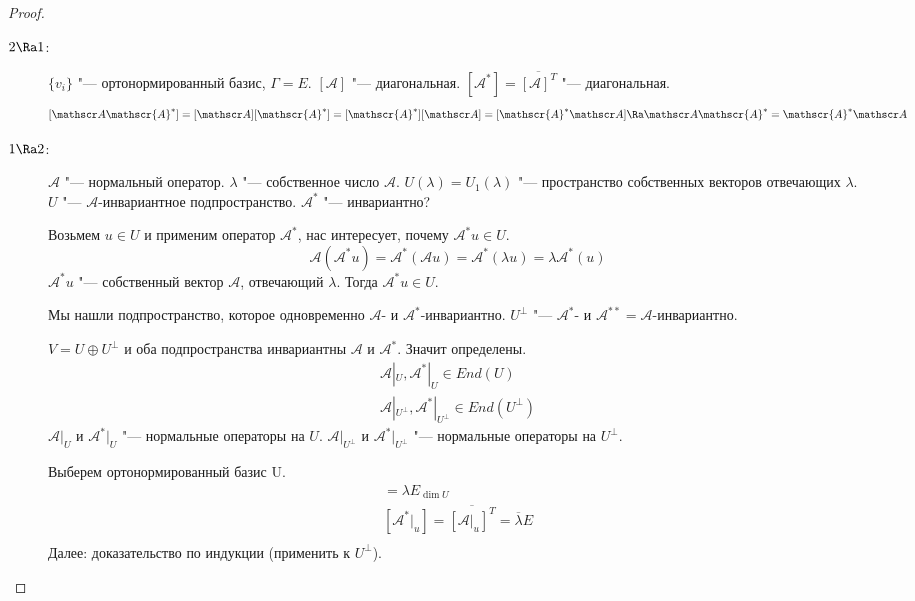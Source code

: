 \begin{proof}
	\begin{description}
	\item[$2 \Ra 1$:]
		$\{v_i\}$ "--- ортонормированный базис, $\Gamma = E$.
		$[\mathscr A] $ "--- диагональная.
		$[\mathscr{A}^*] = \overline{[\mathscr A]^T}$ "--- диагональная.
		\[
			[\mathscr A\mathscr{A}^*]
			= [\mathscr A][\mathscr{A}^*]
			= [\mathscr{A}^*][\mathscr A]
			= [\mathscr{A}^*\mathscr A]
			\Ra \mathscr A\mathscr{A}^*
			= \mathscr{A}^*\mathscr A
		\]

	\item[$1 \Ra 2$:]
		$\mathscr A$ "--- нормальный оператор.
		$\lambda$ "--- собственное число $\mathscr A$.
		$U(\lambda) = U_1(\lambda)$ "--- пространство собственных векторов отвечающих $\lambda$.
		$U$ "--- $\mathscr A$-инвариантное подпространство.
		$\mathscr{A}^*$ "--- инвариантно?

		Возьмем $u \in U$ и применим оператор $\mathscr{A}^*$, нас интересует, почему $\mathscr{A}^*u \in U$.
		\[ \mathscr A(\mathscr{A}^*u) = \mathscr{A}^*(\mathscr Au) = \mathscr{A}^*(\lambda u) = \lambda \mathscr{A}^*(u) \]
		$\mathscr{A}^*u$ "--- собственный вектор $\mathscr A$, отвечающий $\lambda$.
		Тогда $\mathscr{A}^*u \in U$.

		Мы нашли подпространство, которое одновременно $\mathscr A$- и $\mathscr{A}^*$-инвариантно.
		$U^{\bot}$ "--- $\mathscr{A}^*$- и $\mathscr{A}^{**} = \mathscr A$-инвариантно.

		$V = U \oplus U^{\bot}$ и оба подпространства инвариантны $\mathscr A$ и $\mathscr{A}^*$.
		Значит определены.
		\begin{gather*}
			\mathscr A|_U, \mathscr{A}^*|_U \in End(U) \\
			\mathscr A|_{U^{\bot}}, \mathscr{A}^*|_{U^{\bot}} \in End(U^{\bot})
		\end{gather*}
		$\mathscr A|_U$ и $\mathscr{A}^*|_U$ "--- нормальные операторы на $U$.
		$\mathscr A|_{U^{\bot}}$ и $\mathscr{A}^*|_{U^{\bot}}$ "--- нормальные операторы на $U^{\bot}$.

		Выберем ортонормированный базис U.
		\begin{gather*}
			[\mathscr A|_u] = \lambda E_{\dim U} \\
			[\mathscr{A}^*|_u] = \overline{[\mathscr A|_u]^T} = \overline{\lambda}E \\
		\end{gather*}
		Далее: доказательство по индукции (применить к $U^{\bot}$).
	\end{description}
\end{proof}

